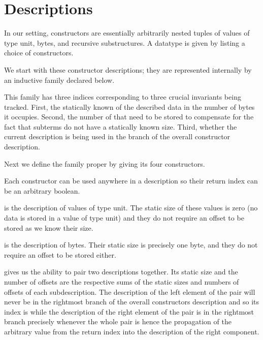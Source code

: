 \section{Descriptions}\label{sec:desc}


In our setting, constructors are essentially arbitrarily nested tuples of
values of type unit,
bytes,
and recursive substructures.
%
A datatype is given by listing a choice of constructors.


We start with these constructor descriptions;
they are represented internally by an inductive family 
declared below.


This family has three indices corresponding to three crucial
invariants being tracked.
%
First, the statically known  of the described data
in the number of bytes it occupies.
%
Second, the number of  that need to be stored to
compensate for the fact that subterms do not have a statically known
size.
%
Third, whether the current description is being used in the
 branch of the overall constructor description.

Next we define the family proper by giving its four constructors.


Each constructor can be used anywhere in a description so their return
 index can be an arbitrary boolean.

 is the description of values of type unit. The static
size of these values is zero (no data is stored in a value of type unit)
and they do not require an offset to be stored as we know their size.

 is the description of bytes.
%
Their static size is precisely one byte, and they do not require an
offset to be stored either.

 gives us the ability to pair two descriptions together.
Its static size and the number of offsets are the respective sums of the
static sizes and numbers of offsets of each subdescription.
%
The description of the left element of the pair will never be in the
rightmost branch of the overall constructors description and so its
index is  while the description of the right element
of the pair is in the rightmost branch precisely whenever the whole pair
is hence the propagation of the  arbitrary value from the
return index into the description of the right component.

